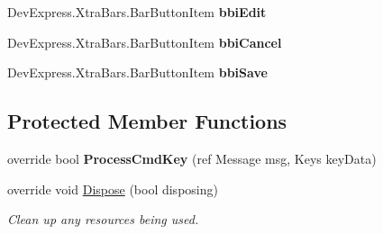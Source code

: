 \begin{DoxyCompactItemize}
Dev\+Express.\+Xtra\+Bars.\+Bar\+Button\+Item {\bfseries bbi\+Edit}
\item 
\mbox{\label{class_h_k_supply_1_1_forms_1_1_ribbon_form_base_a761c21a5b057fb7024f0cabb5db7d3e3}} 
Dev\+Express.\+Xtra\+Bars.\+Bar\+Button\+Item {\bfseries bbi\+Cancel}
\item 
\mbox{\label{class_h_k_supply_1_1_forms_1_1_ribbon_form_base_ab7dea0c7ad75ee898b48d3e87799a295}} 
Dev\+Express.\+Xtra\+Bars.\+Bar\+Button\+Item {\bfseries bbi\+Save}
\end{DoxyCompactItemize}
\subsection*{Protected Member Functions}
\begin{DoxyCompactItemize}
\item 
\mbox{\label{class_h_k_supply_1_1_forms_1_1_ribbon_form_base_af86b4cc87ab6354fa29f481044ffc9c9}} 
override bool {\bfseries Process\+Cmd\+Key} (ref Message msg, Keys key\+Data)
\item 
override void \mbox{\hyperlink{class_h_k_supply_1_1_forms_1_1_ribbon_form_base_a550191c92b26d28e11d1f68f66f57d30}{Dispose}} (bool disposing)
\begin{DoxyCompactList}\small\item\em Clean up any resources being used. \end{DoxyCompactList}\end{DoxyCompactItemize}
